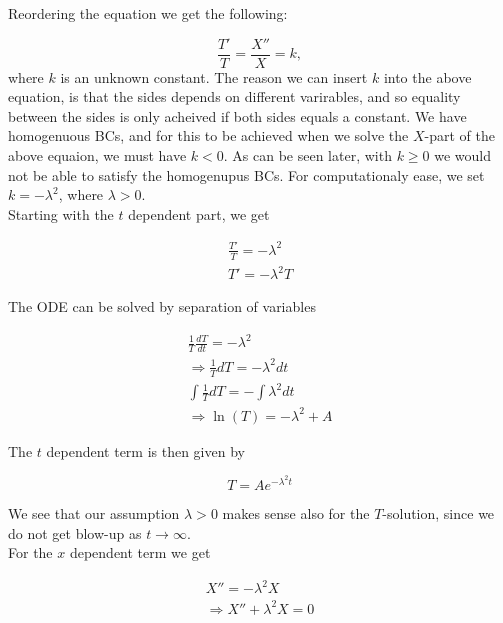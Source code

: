 \documentclass{article}
\begin{document}
Reordering the equation we get the following:

\begin{equation}
\frac{T'}{T} = \frac{X''}{X} = k,
\end{equation}
where $k$ is an unknown constant. The reason we can insert $k$ into the above equation, is that the sides depends on different varirables, and so equality between the sides is only acheived if both sides equals a constant. We have homogenuous BCs, and for this to be achieved when we solve the $X$-part of the above equaion, we must have $k <0$. As can be seen later, with $k\geq 0$ we would not be able to satisfy the homogenupus BCs. For computationaly ease, we set $k = -\lambda^2$, where $\lambda > 0$. \\

Starting with the $t$ dependent part, we get

\begin{eqnarray}
\frac{T'}{T} = -\lambda^2 \\ 
T' = -\lambda^2 T
\end{eqnarray}

The ODE can be solved by separation of variables

\begin{subequations}
	\begin{eqnarray}
	\label{eqn:solvingTdependentTransientTerm1D}
	\frac{1}{T}\frac{dT}{dt} = -\lambda^2 \\ 
	\Rightarrow \frac{1}{T} dT = -\lambda^2 dt\\
	\int \frac{1}{T}dT = - \int \lambda^2 dt \\
	\Rightarrow \ln(T) = -\lambda^2 + A
	\end{eqnarray}
\end{subequations}

The $t$ dependent term is then given by

\begin{equation}
T = Ae^{-\lambda^2 t}
\label{eqn:tdependentTransientTerm1D}
\end{equation}

We see that our assumption $\lambda > 0$ makes sense also for the $T$-solution, since we do not get blow-up as $t \rightarrow \infty$. \\

For the $x$ dependent term we get

\begin{subequations}
	\begin{eqnarray}
	X'' = -\lambda^2 X \\
	\Rightarrow X'' + \lambda^2 X = 0 
	\end{eqnarray}
\end{subequations}
\end{document}
